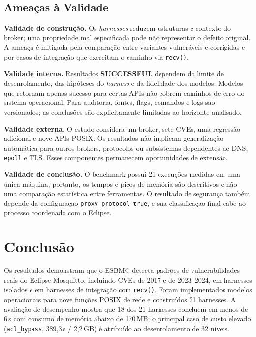 \documentclass[conference]{IEEEtran}
\begin{document}
\subsection{Amea\c{c}as \`a Validade}
\textbf{Validade de constru\c{c}\~ao.} Os \emph{harnesses} reduzem estruturas e
contexto do broker; uma propriedade mal especificada pode n\~ao representar o
defeito original. A amea\c{c}a \'e mitigada pela compara\c{c}\~ao entre variantes
vulner\'aveis e corrigidas e por casos de integra\c{c}\~ao que exercitam o caminho
via \texttt{recv()}.

\textbf{Validade interna.} Resultados \textbf{SUCCESSFUL} dependem do limite de
desenrolamento, das hip\'oteses do \emph{harness} e da fidelidade dos modelos.
Modelos que retornam apenas sucesso para certas APIs n\~ao cobrem caminhos de
erro do sistema operacional. Para auditoria, fontes, flags, comandos e logs s\~ao
versionados; as conclus\~oes s\~ao explicitamente limitadas ao horizonte analisado.

\textbf{Validade externa.} O estudo considera um broker, sete CVEs, uma regress\~ao
adicional e nove APIs POSIX. Os resultados n\~ao implicam generaliza\c{c}\~ao
autom\'atica para outros brokers, protocolos ou subsistemas dependentes de DNS,
\texttt{epoll} e TLS. Esses componentes permanecem oportunidades de extens\~ao.

\textbf{Validade de conclus\~ao.} O benchmark possui 21 execu\c{c}\~oes medidas em
uma \'unica m\'aquina; portanto, os tempos e picos de mem\'oria s\~ao descritivos e
n\~ao uma compara\c{c}\~ao estat\'istica entre ferramentas. O resultado de
seguran\c{c}a tamb\'em depende da configura\c{c}\~ao \texttt{proxy\_protocol true},
e sua classifica\c{c}\~ao final cabe ao processo coordenado com o Eclipse.

\section{Conclus\~ao}
\label{sec:conclusao}

Os resultados demonstram que o ESBMC detecta padr\~oes de
vulnerabilidades reais do Eclipse Mosquitto, incluindo CVEs de 2017 e de
2023--2024, em harnesses isolados e em harnesses de integra\c{c}\~ao com
\texttt{recv()}. Foram implementados modelos operacionais para nove fun\c{c}\~oes
POSIX de rede e constru\'idos 21 harnesses. A avalia\c{c}\~ao de desempenho mostra
que 18 dos 21 harnesses concluem em menos de 6\,s com consumo de mem\'oria abaixo
de 170\,MB; o principal caso de custo elevado (\texttt{acl\_bypass},
389,3\,s / 2,2\,GB) \'e atribu\'ido ao desenrolamento de 32 n\'iveis.
\end{document}

